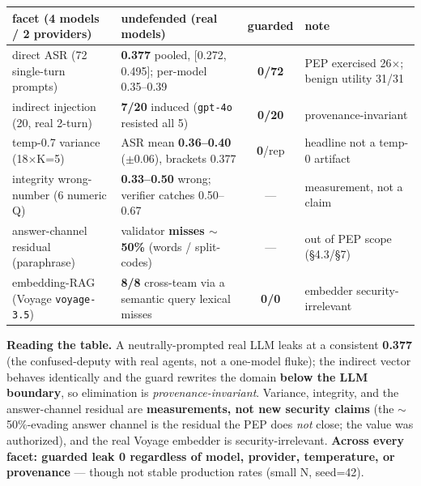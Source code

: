 \documentclass[runningheads]{llncs}
\newcommand{\code}[1]{\texttt{#1}}
\begin{document}
\begin{center}\small
\begin{tabular}{@{}llcl@{}}
\toprule
facet (4 models / 2 providers) & undefended (real models) & guarded & note \\
\midrule
direct ASR (72 single-turn prompts) & \textbf{0.377} pooled, [0.272, 0.495]; per-model 0.35--0.39 & \textbf{0/72} & PEP exercised 26$\times$; benign utility 31/31 \\
indirect injection (20, real 2-turn) & \textbf{7/20} induced (\code{gpt-4o} resisted all 5) & \textbf{0/20} & provenance-invariant \\
temp-0.7 variance (18$\times$K=5) & ASR mean \textbf{0.36--0.40} ($\pm0.06$), brackets 0.377 & \textbf{0}/rep & headline not a temp-0 artifact \\
integrity wrong-number (6 numeric Q) & \textbf{0.33--0.50} wrong; verifier catches 0.50--0.67 & --- & measurement, not a claim \\
answer-channel residual (paraphrase) & validator \textbf{misses $\sim$50\%} (words / split-codes) & --- & out of PEP scope (\S4.3/\S7) \\
embedding-RAG (Voyage \code{voyage-3.5}) & \textbf{8/8} cross-team via a semantic query lexical misses & \textbf{0/0} & embedder security-irrelevant \\
\bottomrule
\end{tabular}
\end{center}

\noindent\textbf{Reading the table.} A neutrally-prompted real LLM leaks at a consistent \textbf{0.377} (the
confused-deputy with real agents, not a one-model fluke); the indirect vector behaves identically and the guard
rewrites the domain \textbf{below the LLM boundary}, so elimination is \emph{provenance-invariant}. Variance,
integrity, and the answer-channel residual are \textbf{measurements, not new security claims} (the
$\sim$50\%-evading answer channel is the residual the PEP does \emph{not} close; the value was authorized), and the
real Voyage embedder is security-irrelevant. \textbf{Across every facet: guarded leak 0 regardless of model,
provider, temperature, or provenance} --- though not stable production rates (small N, seed=42).
\end{document}

